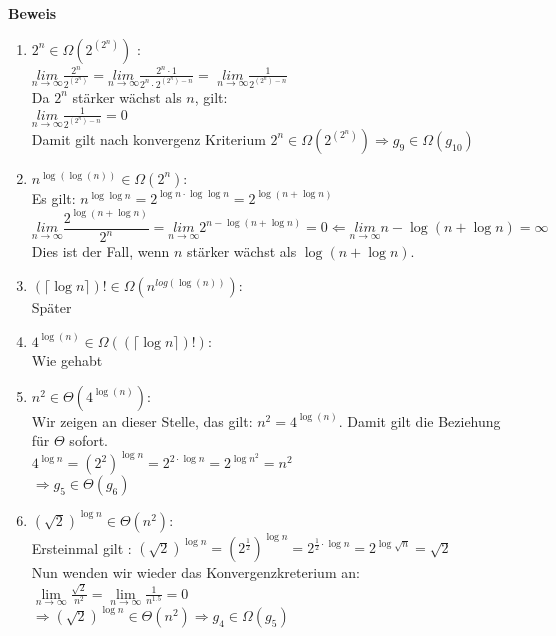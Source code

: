 \documentclass[11pt,a4paper,ngerman]{article}
\begin{document}
\begin{description}
\item{\textbf{Beweis}} 
\begin{enumerate}

\item
$  2^n  \in \Omega (2^{(2^n)})$ : \\
$\underset{n\rightarrow\infty}{lim} \frac{2^n}{2^{(2^n)}} = \underset{n\rightarrow\infty}{lim} \frac{2^n \cdot 1}{2^n \cdot 2^{(2^n) - n}} = $
$ \underset{n\rightarrow\infty}{lim} \frac{1}{2^{(2^n) - n}}$\\
Da $2^n$ stärker wächst als $n$, gilt:\\
$ \underset{n\rightarrow\infty}{lim} \frac{1}{2^{(2^n) - n}} = 0$\\
Damit gilt nach konvergenz Kriterium $2^n \in \Omega (2^{(2^n)})\Rightarrow g_9 \in \Omega (g_{10})$

\item
$ n^{\log{(\log{(n)})}} \in \Omega (2^n)$: \\
Es gilt: $n^{\log \log n} = 2^{\log n \cdot \log \log n} = 2^{\log (n + \log n)}$\\
$$
\underset{n\rightarrow\infty}{lim} \frac{ 2^{\log (n + \log n)}}{2^n} = \underset{n\rightarrow\infty}{lim} 2^{n - \log (n + \log n)} = 0 \Leftarrow \underset{n\rightarrow\infty}{lim} n - \log (n + \log n) = \infty
$$
Dies ist der Fall, wenn $n$ stärker wächst als $ \log (n + \log n) $.
\item
$(\lceil \log{n} \rceil)! \in \Omega (n^{log{(\log{(n)})}})$: \\
Später

\item
$4^{\log{(n)}} \in \Omega ((\lceil \log{n} \rceil)!)$: \\
Wie gehabt

\item
$n^2 \in \Theta (4^{\log{(n)}})$: \\
Wir zeigen an dieser Stelle, das gilt: $n^2 = 4^{\log{(n)}}$. Damit gilt die Beziehung für $\Theta$ sofort.\\
$4^{\log n} = (2^2)^{\log n} =  2^{2\cdot \log n} = 2^{\log n^2} = n^2$\\
$\Rightarrow g_5 \in \Theta (g_6)$

\item
$(\sqrt{2})^{\log{n}} \in \Theta (n^2)$:\\
Ersteinmal gilt : $(\sqrt{2})^{\log{n}} = (2^{\frac{1}{2}})^{\log n} = 2^{\frac{1}{2} \cdot \log n} = 2^{\log \sqrt{n}} = \sqrt{2}$\\
Nun wenden wir wieder das Konvergenzkreterium an: \\
$\underset{n\rightarrow\infty}{\lim} \frac{\sqrt{2}}{n^2} = \underset{n\rightarrow\infty}{\lim} \frac{1}{n^{1.5}} = 0$\\
$\Rightarrow (\sqrt{2})^{\log{n}} \in \Theta (n^2) \Rightarrow g_4 \in \Omega (g_5)$


\end{enumerate}
\end{description}
\end{document}
